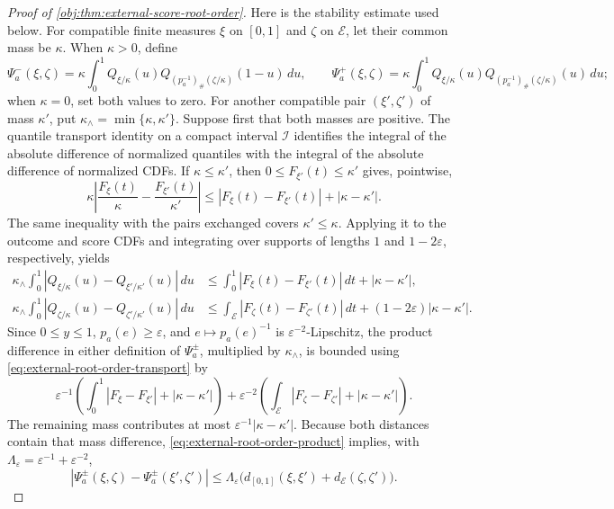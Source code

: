 \documentclass[11pt]{article}
\begin{document}
\begin{proof}[Proof of \cref{obj:thm:external-score-root-order}]
Here is the stability estimate used below. For compatible finite measures \(\xi\) on \([0,1]\) and \(\zeta\) on \(\mathcal E\), let their common mass be \(\kappa\). When \(\kappa>0\), define
\[
\Psi_a^-(\xi,\zeta)
=\kappa\int_0^1 Q_{\xi/\kappa}(u)
 Q_{(p_a^{-1})_\#(\zeta/\kappa)}(1-u)\,du,
\qquad
\Psi_a^+(\xi,\zeta)
=\kappa\int_0^1 Q_{\xi/\kappa}(u)
 Q_{(p_a^{-1})_\#(\zeta/\kappa)}(u)\,du;
\]
when \(\kappa=0\), set both values to zero. For another compatible pair \((\xi',\zeta')\) of mass \(\kappa'\), put \(\kappa_\wedge=\min\{\kappa,\kappa'\}\). Suppose first that both masses are positive. The quantile transport identity on a compact interval \(\mathcal I\) identifies the integral of the absolute difference of normalized quantiles with the integral of the absolute difference of normalized CDFs. If \(\kappa\leq\kappa'\), then \(0\leq F_{\xi'}(t)\leq\kappa'\) gives, pointwise,
\[
\kappa\left|\frac{F_\xi(t)}{\kappa}-\frac{F_{\xi'}(t)}{\kappa'}\right|
\leq |F_\xi(t)-F_{\xi'}(t)|+|\kappa-\kappa'|.
\]
The same inequality with the pairs exchanged covers \(\kappa'\leq\kappa\). Applying it to the outcome and score CDFs and integrating over supports of lengths \(1\) and \(1-2\varepsilon\), respectively, yields
\[
\begin{aligned}
\kappa_\wedge\int_0^1
 |Q_{\xi/\kappa}(u)-Q_{\xi'/\kappa'}(u)|\,du
&\leq
\int_0^1|F_\xi(t)-F_{\xi'}(t)|\,dt+|\kappa-\kappa'|,\\
\kappa_\wedge\int_0^1
 |Q_{\zeta/\kappa}(u)-Q_{\zeta'/\kappa'}(u)|\,du
&\leq
\int_{\mathcal E}|F_\zeta(t)-F_{\zeta'}(t)|\,dt
 +(1-2\varepsilon)|\kappa-\kappa'|.
\end{aligned} \label{eq:external-root-order-transport}
\]
Since \(0\leq y\leq1\), \(p_a(e)\geq\varepsilon\), and \(e\mapsto p_a(e)^{-1}\) is \(\varepsilon^{-2}\)-Lipschitz, the product difference in either definition of \(\Psi_a^\pm\), multiplied by \(\kappa_\wedge\), is bounded using \cref{eq:external-root-order-transport} by
\[
\varepsilon^{-1}
 \left(\int_0^1|F_\xi-F_{\xi'}|+|\kappa-\kappa'|\right)
+\varepsilon^{-2}
 \left(\int_{\mathcal E}|F_\zeta-F_{\zeta'}|
       +|\kappa-\kappa'|\right). \label{eq:external-root-order-product}
\]
The remaining mass contributes at most \(\varepsilon^{-1}|\kappa-\kappa'|\). Because both distances contain that mass difference, \cref{eq:external-root-order-product} implies, with
\(\Lambda_\varepsilon=\varepsilon^{-1}+\varepsilon^{-2}\),
\[
|\Psi_a^\pm(\xi,\zeta)-\Psi_a^\pm(\xi',\zeta')|
\leq
\Lambda_\varepsilon
 \bigl(d_{[0,1]}(\xi,\xi')+d_{\mathcal E}(\zeta,\zeta')\bigr). \label{eq:external-root-order-stability}
\]
\end{proof}
\end{document}
